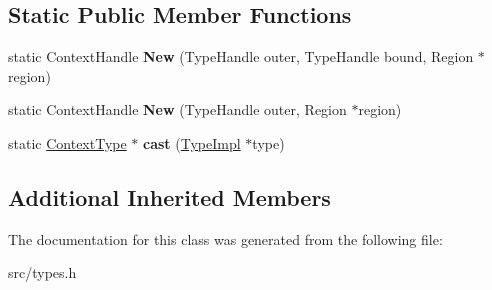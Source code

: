 \subsection*{Static Public Member Functions}
\begin{DoxyCompactItemize}
\item 
\hypertarget{classv8_1_1internal_1_1_type_impl_1_1_context_type_a39feb60078ba2b15633c83dcdb28568d}{}static Context\+Handle {\bfseries New} (Type\+Handle outer, Type\+Handle bound, Region $\ast$region)\label{classv8_1_1internal_1_1_type_impl_1_1_context_type_a39feb60078ba2b15633c83dcdb28568d}

\item 
\hypertarget{classv8_1_1internal_1_1_type_impl_1_1_context_type_a60c843793ef3c0f0c06ded8d068697d0}{}static Context\+Handle {\bfseries New} (Type\+Handle outer, Region $\ast$region)\label{classv8_1_1internal_1_1_type_impl_1_1_context_type_a60c843793ef3c0f0c06ded8d068697d0}

\item 
\hypertarget{classv8_1_1internal_1_1_type_impl_1_1_context_type_a9142dd9cdf03e397d4597f67aa183de8}{}static \hyperlink{classv8_1_1internal_1_1_type_impl_1_1_context_type}{Context\+Type} $\ast$ {\bfseries cast} (\hyperlink{classv8_1_1internal_1_1_type_impl}{Type\+Impl} $\ast$type)\label{classv8_1_1internal_1_1_type_impl_1_1_context_type_a9142dd9cdf03e397d4597f67aa183de8}

\end{DoxyCompactItemize}
\subsection*{Additional Inherited Members}


The documentation for this class was generated from the following file\+:\begin{DoxyCompactItemize}
\item 
src/types.\+h\end{DoxyCompactItemize}
